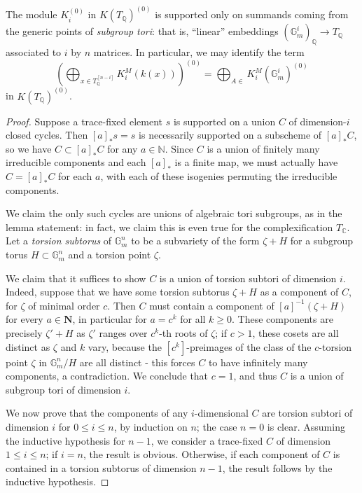 \documentclass[10pt,a4paper]{amsart}
\newcommand{\C}{\mathbb{C}}
\newcommand{\G}{\mathbb{G}}
\newcommand{\Q}{\mathbb{Q}}
\begin{document}
    \begin{lem}
        The module $K_i^{(0)}$ in $K(T_\Q)^{(0)}$ is supported only on summands coming from the generic points of \emph{subgroup tori}: that is, ``linear'' embeddings $(\G_m^i)_\Q \to T_\Q$ associated to $i$ by $n$ matrices. In particular, we may identify the term
        \[
            \left(\bigoplus_{x\in T_\Q^{[n-i]}} K_i^M(k(x))\right)^{(0)}= \bigoplus_{A\in } K_i^M(\G_m^{i})^{(0)}
        \]
        in $K(T_\Q)^{(0)}$. 
    \end{lem}

    \begin{proof}    
        Suppose a trace-fixed element $s$ is supported on a union $C$ of dimension-$i$ closed cycles. Then $[a]_*s=s$ is necessarily supported on a subscheme of $[a]_*C$, so we have $C\subset [a]_*C$ for any $a\in \mathbb{N}$. Since $C$ is a union of finitely many irreducible components and each $[a]_*$ is a finite map, we must actually have $C = [a]_*C$ for each $a$, with each of these isogenies permuting the irreducible components. 
        
        We claim the only such cycles are unions of algebraic tori subgroups, as in the lemma statement: in fact, we claim this is even true for the complexification $T_\C$. Let a \emph{torsion subtorus} of $\G_m^n$ to be a subvariety of the form $\zeta + H$ for a subgroup torus $H\subset \G_m^n$ and a torsion point $\zeta$. 
        
        We claim that it suffices to show $C$ is a union of torsion subtori of dimension $i$. Indeed, suppose that we have some torsion subtorus $\zeta+H$ as a component of $C$, for $\zeta$ of minimal order $c$. Then $C$ must contain a component of $[a]^{-1}(\zeta+H)$ for every $a\in \mathbf{N}$, in particular for $a=c^k$ for all $k\ge 0$. These components are precisely $\zeta'+H$ as $\zeta'$ ranges over $c^k$-th roots of $\zeta$; if $c>1$, these cosets are all distinct as $\zeta$ and $k$ vary, because the $[c^k]$-preimages of the class of the $c$-torsion point $\zeta$ in $\G_m^n/H$ are all distinct - this forces $C$ to have infinitely many components, a contradiction. We conclude that $c=1$, and thus $C$ is a union of subgroup tori of dimension $i$.

        We now prove that the components of any $i$-dimensional $C$ are torsion subtori of dimension $i$ for $0\le i \le n$, by induction on $n$; the case $n=0$ is clear. Assuming the inductive hypothesis for $n-1$, we consider a trace-fixed $C$ of dimension $1\le i \le n$; if $i=n$, the result is obvious. Otherwise, if each component of $C$ is contained in a torsion subtorus of dimension $n-1$, the result follows by the inductive hypothesis. 
        

\end{proof}
\end{document}
